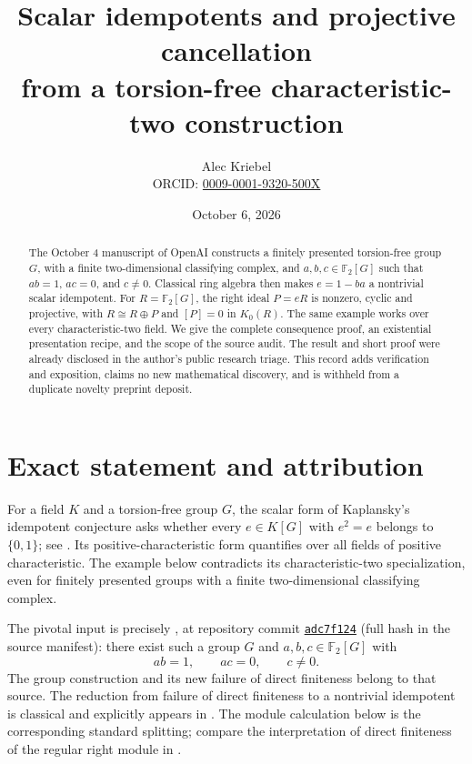 \documentclass[11pt]{article}
\title{Scalar idempotents and projective cancellation\\from a torsion-free characteristic-two construction}
\author{Alec Kriebel\\\small ORCID: \href{https://orcid.org/0009-0001-9320-500X}{0009-0001-9320-500X}}
\date{October 6, 2026}
\newcommand{\Ftwo}{\mathbb F_2}
\begin{document}
\maketitle
\begin{abstract}
The October 4 manuscript of OpenAI constructs a finitely presented
torsion-free group $G$, with a finite two-dimensional classifying complex,
and $a,b,c\in\Ftwo[G]$ such that $ab=1$, $ac=0$, and $c\ne0$.
Classical ring algebra then makes $e=1-ba$ a nontrivial scalar idempotent.
For $R=\Ftwo[G]$, the right ideal $P=eR$ is nonzero, cyclic and projective,
with $R\cong R\oplus P$ and $[P]=0$ in $K_0(R)$.
The same example works over every characteristic-two field.
We give the complete consequence proof, an existential presentation recipe,
and the scope of the source audit. The result and short proof were already
disclosed in the author's public research triage. This record adds
verification and exposition, claims no new mathematical discovery,
and is withheld from a duplicate novelty preprint deposit.
\end{abstract}

\section{Exact statement and attribution}
For a field $K$ and a torsion-free group $G$, the scalar form of
Kaplansky's idempotent conjecture asks whether every $e\in K[G]$ with
$e^2=e$ belongs to $\{0,1\}$; see \cite[Problem 1(c)]{Oinert}.
Its positive-characteristic form quantifies over all fields of positive
characteristic. The example below contradicts its characteristic-two
specialization, even for finitely presented groups with a finite
two-dimensional classifying complex.

The pivotal input is precisely \cite[Theorem 1.1]{OpenAI}, at repository
commit \href{https://github.com/openai/math/tree/adc7f1241b42e322a6451854ab7e4b4c146bf78a}{\texttt{adc7f124}} (full hash in the source manifest):
there exist such a group $G$ and $a,b,c\in\Ftwo[G]$ with
\begin{equation}\label{eq:input}
ab=1,\qquad ac=0,\qquad c\ne0.
\end{equation}
The group construction and its new failure of direct finiteness belong to
that source. The reduction from failure of direct finiteness to a
nontrivial idempotent is classical and explicitly appears in
\cite[Proposition \texttt{kaplansky\_relations}]{Gardam}.
The module calculation below is the corresponding standard splitting;
compare the interpretation of direct finiteness of the regular right
module in \cite[p.~9]{Ara}.
\end{document}

